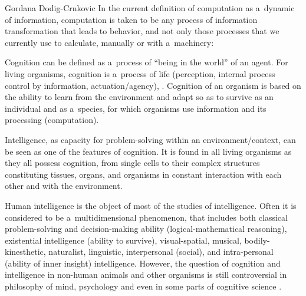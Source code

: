 \begin{artengenv}{Gordana Dodig-Crnkovic}
{}
In the current definition of computation as a~dynamic of information, computation is taken to be any process of information transformation that leads to behavior, and not only those processes that we currently use to calculate, manually or with a~machinery:

Cognition can be defined as a~process of ``being in the world'' of an agent. For living organisms, cognition is a~process of life (perception, internal process control by information, actuation/agency),
\parencites{maturana_biology_1970}{maturana_autopoiesis_1980}{stewart_cognition_1996}.
Cognition of an organism is based on the ability to learn from the environment and adapt so as to survive as an individual and as a~species, for which organisms use information and its processing (computation).

Intelligence, as capacity for problem-solving within an environment/context, can be seen as one of the features of cognition. It is found in all living organisms as they all possess cognition, from single cells to their complex structures constituting tissues, organs, and organisms in constant interaction with each other and with the environment.

Human intelligence is the object of most of the studies of intelligence. Often it is considered to be a~multidimensional phenomenon, that includes both classical problem-solving and decision-making ability (logical-mathematical reasoning), existential intelligence (ability to survive), visual-spatial, musical, bodily-kinesthetic, naturalist, linguistic, interpersonal (social), and intra-personal (ability of inner insight) intelligence. However, the question of cognition and intelligence in non-human animals and other organisms is still controversial in philosophy of mind, psychology and even in some parts of cognitive science
\parencite[][]{ball_book_2022}.%



\end{artengenv}
